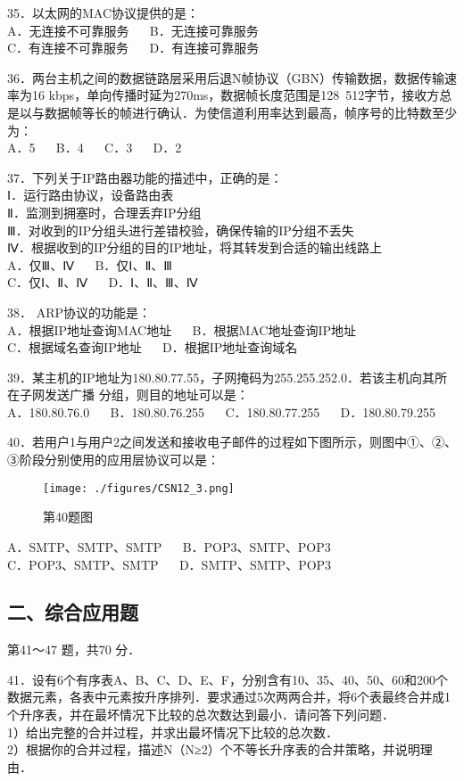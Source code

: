 35．以太网的MAC协议提供的是：\\
A．无连接不可靠服务 $\quad$ B．无连接可靠服务 \\
C．有连接不可靠服务 $\quad$ D．有连接可靠服务

36．两台主机之间的数据链路层采用后退N帧协议（GBN）传输数据，数据传输速率为16 kbps，单向传播时延为270ms，数据帧长度范围是128~512字节，接收方总是以与数据帧等长的帧进行确认．为使信道利用率达到最高，帧序号的比特数至少为： \\
A．5 $\quad$ B．4 $\quad$ C．3 $\quad$ D．2

37．下列关于IP路由器功能的描述中，正确的是：\\
Ⅰ．运行路由协议，设备路由表 \\
Ⅱ．监测到拥塞时，合理丢弃IP分组 \\
Ⅲ．对收到的IP分组头进行差错校验，确保传输的IP分组不丢失 \\
Ⅳ．根据收到的IP分组的目的IP地址，将其转发到合适的输出线路上 \\
A．仅Ⅲ、Ⅳ  $\quad$ B．仅Ⅰ、Ⅱ、Ⅲ \\
C．仅Ⅰ、Ⅱ、Ⅳ  $\quad$ D．Ⅰ、Ⅱ、Ⅲ、Ⅳ

38． ARP协议的功能是：\\
A．根据IP地址查询MAC地址 $\quad$ B．根据MAC地址查询IP地址 \\
C．根据域名查询IP地址 $\quad$ D．根据IP地址查询域名

39．某主机的IP地址为180.80.77.55，子网掩码为255.255.252.0．若该主机向其所在子网发送广播
分组，则目的地址可以是：\\
A．180.80.76.0 $\quad$ B．180.80.76.255 $\quad$ C．180.80.77.255 $\quad$ D．180.80.79.255

40．若用户1与用户2之间发送和接收电子邮件的过程如下图所示，则图中①、②、③阶段分别使用的应用层协议可以是：\\
\begin{figure}[ht]
\centering
\texttt{[image: ./figures/CSN12\_3.png]}
\caption{第40题图} \label{CSN12_fig3}
\end{figure}
A．SMTP、SMTP、SMTP $\quad$ B．POP3、SMTP、POP3 \\
C．POP3、SMTP、SMTP $\quad$ D．SMTP、SMTP、POP3

\subsection{二、综合应用题}
第41～47 题，共70 分．

41．设有6个有序表A、B、C、D、E、F，分别含有10、35、40、50、60和200个数据元素，各表中元素按升序排列．要求通过5次两两合并，将6个表最终合并成1个升序表，并在最坏情况下比较的总次数达到最小．请问答下列问题．\\
1）给出完整的合并过程，并求出最坏情况下比较的总次数．\\
2）根据你的合并过程，描述N（N≥2）个不等长升序表的合并策略，并说明理由．

